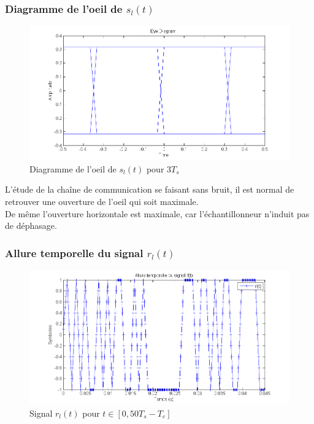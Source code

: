 \documentclass[11pt]{article}
\begin{document}
		\subsubsection{Diagramme de l'oeil de $s_l(t)$}
			\begin{figure}[h]
				\centering
				\includegraphics[scale=0.5]{images/Q312.png}
				\caption{Diagramme de l'oeil de $s_l(t)$ pour $3T_s$}
				\label{Q312}
			\end{figure}
			L'étude de la chaîne de communication se faisant sans bruit, il est normal de retrouver une ouverture de l'oeil qui soit maximale.\\
			De même l'ouverture horizontale est maximale, car l'échantillonneur n'induit pas de déphasage.
			
		\subsubsection{Allure temporelle du signal $r_l(t)$}
			\begin{figure}[h]
				\centering
				\includegraphics[scale=0.5]{images/Q313.png}
				\caption{Signal $r_l(t)$ pour $t \in [0, 50T_s-T_e]$}
				\label{Q313}
			\end{figure}
		
\end{document}
